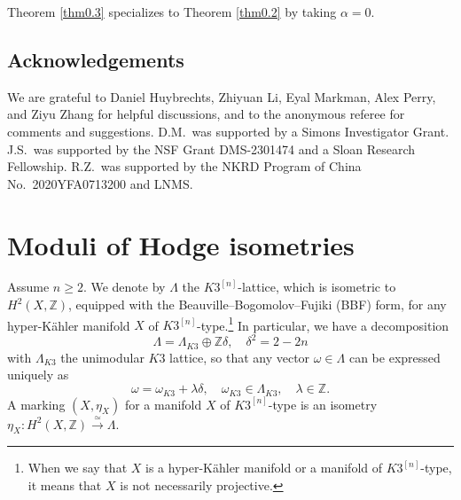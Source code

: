 \documentclass[11pt]{amsart}
\theoremstyle{plain}
\theoremstyle{definition}
\theoremstyle{remark}
\newcommand{\BP}{{\mathbb{P}}}
\newcommand{\BZ}{{\mathbb{Z}}}
\begin{document}
Theorem \ref{thm0.3} specializes to Theorem \ref{thm0.2} by taking $\alpha = 0$.

\subsection*{Acknowledgements}
We are grateful to Daniel Huybrechts, Zhiyuan Li, Eyal Markman, Alex Perry, and Ziyu Zhang for helpful discussions, and to the anonymous referee for comments and suggestions. D.M.~was supported by a Simons Investigator Grant. J.S.~was supported by the NSF Grant DMS-2301474 and a Sloan Research Fellowship. R.Z.~was supported by the NKRD Program of China No.~2020YFA0713200 and LNMS.


\section{Moduli of Hodge isometries}

Assume $n\geq 2$. We denote by $\Lambda$ the $K3^{[n]}$-lattice, which is isometric to $H^2(X, \BZ)$, equipped with the Beauville--Bogomolov--Fujiki (BBF) form, for any hyper-K\"ahler manifold $X$ of $K3^{[n]}$-type.\footnote{When we say that $X$ is a hyper-K\"ahler manifold or a manifold of $K3^{[n]}$-type, it means that $X$ is not necessarily projective.} In particular, we have a decomposition
\[
\Lambda = \Lambda_{K3} \oplus \BZ \delta, \quad \delta^2 = 2-2n
\]
with $\Lambda_{K3}$ the unimodular $K3$ lattice, so that any vector $\omega \in \Lambda$ can be expressed uniquely as 
\[
\omega = \omega_{K3} + \lambda \delta, \quad \omega_{K3} \in \Lambda_{K3}, \quad \lambda \in \BZ.
\]
A marking $(X, \eta_X)$ for a manifold $X$ of $K3^{[n]}$-type is an isometry $\eta_X: H^2(X, \BZ) \xrightarrow{\simeq} \Lambda$.
\end{document}
